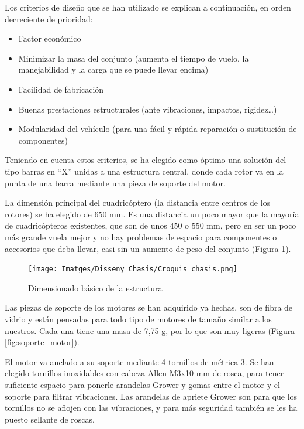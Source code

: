 \documentclass[12pt,twoside]{article}
\begin{document}
Los criterios de diseño que se han utilizado se explican a continuación, en orden decreciente de prioridad: 
		\begin{itemize}
		\item Factor económico
		\item Minimizar la masa del conjunto (aumenta el tiempo de vuelo, la manejabilidad y la carga que se puede llevar encima)
		\item Facilidad de fabricación
		\item Buenas prestaciones estructurales (ante vibraciones, impactos, rigidez…)
		\item Modularidad del vehículo (para una fácil y rápida reparación o sustitución de componentes)
		\end{itemize}

		Teniendo en cuenta estos criterios, se ha elegido como óptimo una solución del tipo barras en “X” unidas a una estructura central, donde cada rotor va en la punta de una barra mediante una pieza de soporte del motor.

La dimensión principal del cuadricóptero (la distancia entre centros de los rotores) se ha elegido de 650 mm. Es una distancia un poco mayor que la mayoría de cuadricópteros existentes, que son de unos 450 o 550 mm, pero en ser un poco más grande vuela mejor y no hay problemas de espacio para componentes o accesorios que deba llevar, casi sin un aumento de peso del conjunto (Figura \ref{fig:dimensionado}).

		\begin{figure}
			\centering
			\texttt{[image: Imatges/Disseny\_Chasis/Croquis\_chasis.png]}
			\caption{Dimensionado básico de la estructura}
			\label{fig:dimensionado}
		\end{figure}

Las piezas de soporte de los motores se han adquirido ya hechas, son de fibra de vidrio y están pensadas para todo tipo de motores de tamaño similar a los nuestros. Cada una tiene una masa de 7,75 g, por lo que son muy ligeras (Figura \ref{fig:soporte_motor}).

El motor va anclado a su soporte mediante 4 tornillos de métrica 3. Se han elegido tornillos inoxidables con cabeza Allen M3x10 mm de rosca, para tener suficiente espacio para ponerle arandelas Grower y gomas entre el motor y el soporte para filtrar vibraciones. Las arandelas de apriete Grower son para que los tornillos no se aflojen con las vibraciones, y para más seguridad también se les ha puesto sellante de roscas.
\end{document}
